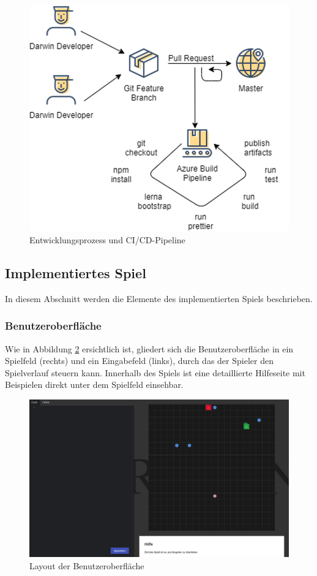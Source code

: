\documentclass[11pt,a4paper,titlepage]{article}
\begin{document}
\begin{figure}[H]
	\centering
	\includegraphics{workflow.png}
	\caption{Entwicklungsprozess und CI/CD-Pipeline}
	\label{pipeline}
\end{figure}

\pagebreak

\subsection{Implementiertes Spiel}

In diesem Abschnitt werden die Elemente des implementierten Spiels beschrieben.

\subsubsection{Benutzeroberfläche}

Wie in Abbildung \ref{gameplay} ersichtlich ist, gliedert sich die Benutzeroberfläche in ein Spielfeld (rechts) und ein Eingabefeld (links), durch das der Spieler den Spielverlauf steuern kann. Innerhalb des Spiels ist eine detaillierte Hilfeseite mit Beispielen direkt unter dem Spielfeld einsehbar.

\begin{figure}[H]
	\centering
	\includegraphics[width=\textwidth]{darwin-gameplay.png}
	\caption{Layout der Benutzeroberfläche}
	\label{gameplay}
\end{figure}
\end{document}
